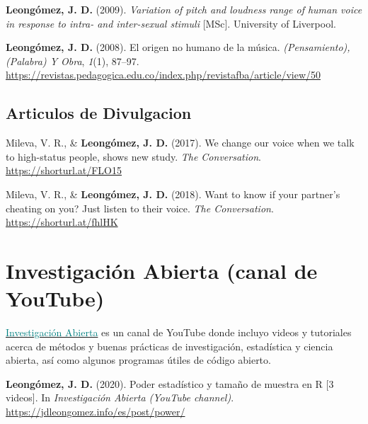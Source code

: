 \documentclass[11pt, a4paper]{awesome-cv}
\begin{document}
\leavevmode\hypertarget{ref-Leongomez2009}{}%
\textbf{Leongómez, J. D.} (2009). \emph{Variation of pitch and loudness range of human voice in response to intra- and inter-sexual stimuli} {[}MSc{]}. University of Liverpool.

\leavevmode\hypertarget{ref-Leongomez2008}{}%
\textbf{Leongómez, J. D.} (2008). El origen no humano de la música. \emph{(Pensamiento), (Palabra) Y Obra}, \emph{1}(1), 87--97. \url{https://revistas.pedagogica.edu.co/index.php/revistafba/article/view/50}

\endgroup

\hypertarget{articulos-de-divulgacion}{%
\subsection{Articulos de Divulgacion}\label{articulos-de-divulgacion}}

\begingroup
\setlength{\parindent}{-0.5in}
\setlength{\leftskip}{0.5in}

\hypertarget{refs_divulgation}{}
\leavevmode\hypertarget{ref-Mileva2017}{}%
Mileva, V. R., \& \textbf{Leongómez, J. D.} (2017). We change our voice when we talk to high-status people, shows new study. \emph{The Conversation}. \url{https://shorturl.at/FLO15}

\leavevmode\hypertarget{ref-Mileva2018}{}%
Mileva, V. R., \& \textbf{Leongómez, J. D.} (2018). Want to know if your partner's cheating on you? Just listen to their voice. \emph{The Conversation}. \url{https://shorturl.at/fhlHK}

\endgroup

\hypertarget{investigaciuxf3n-abierta-canal-de-youtube}{%
\section{Investigación Abierta (canal de YouTube)}\label{investigaciuxf3n-abierta-canal-de-youtube}}

\href{https://www.youtube.com/user/juanleongomez/featured}{\textcolor{teal}{Investigación Abierta}} es un canal de YouTube donde incluyo videos y tutoriales acerca de métodos y buenas prácticas de investigación, estadística y ciencia abierta, así como algunos programas útiles de código abierto.

\begingroup
\setlength{\parindent}{-0.5in}
\setlength{\leftskip}{0.5in}

\hypertarget{refs_IA}{}
\leavevmode\hypertarget{ref-leongomezPower2020}{}%
\textbf{Leongómez, J. D.} (2020). Poder estadístico y tamaño de muestra en R {[}3 videos{]}. In \emph{Investigación Abierta (YouTube channel)}. \url{https://jdleongomez.info/es/post/power/}
\end{document}
